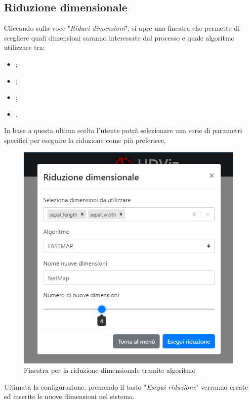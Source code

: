 \newpage
\subsection{Riduzione dimensionale} 
Cliccando sulla voce "\textit{Riduci dimensioni}", si apre una finestra che permette di scegliere quali dimensioni saranno interessate dal processo e quale algoritmo utilizzare tra:

\begin{itemize}
	\item {};
	\item {};
	\item {};
	\item {}.
\end{itemize}

In base a questa ultima scelta l'utente potrà selezionare una serie di parametri specifici per eseguire la riduzione come più preferisce.

\begin{figure}[H]
		\includegraphics[scale=0.65]{Images/RiduzioneDimensionale.png}
		\centering
		\caption{Finestra per la riduzione dimensionale tramite algoritmo}
\end{figure}

Ultimata la configurazione, premendo il tasto "\textit{Esegui riduzione}" verranno create ed inserite le nuove dimensioni nel sistema.

